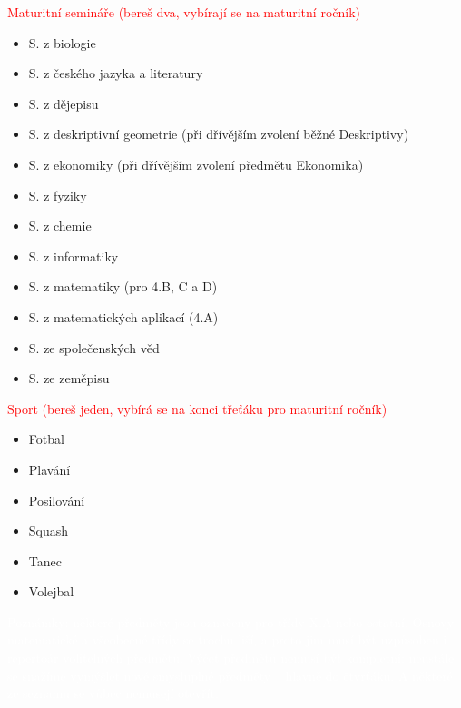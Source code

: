 \documentclass{article}
\begin{document}
\begin{multicols}{2}
  \vfill\null

  \columnbreak

  \noindent \textcolor{red}{Maturitní semináře (bereš dva, vybírají se na maturitní ročník)}
  \begin{itemize}
    \item S. z biologie
    \item S. z českého jazyka a literatury
    \item S. z dějepisu
    \item S. z deskriptivní geometrie (při
    dřívějším zvolení běžné Deskriptivy)
    \item S. z ekonomiky (při dřívějším zvolení předmětu Ekonomika)
    \item S. z fyziky
    \item S. z chemie
    \item S. z informatiky
    \item S. z matematiky (pro 4.B, C a D)
    \item S. z matematických aplikací (4.A)
    \item S. ze společenských věd
    \item S. ze zeměpisu
  \end{itemize}

  \noindent \textcolor{red}{Sport (bereš jeden, vybírá se na konci třeťáku pro maturitní ročník)}
  \begin{itemize}
    \item Fotbal
    \item Plavání
    \item Posilování
    \item Squash
    \item Tanec
    \item Volejbal
  \end{itemize}

  \begin{tcolorbox}[colback=red,boxrule=0pt]
    \textcolor{white}{\footnotesize Poznámky:
     některé předměty jsou označeny pro třídy X.A
      nebo ostatní. Osnovy matematické a všeobecné třídy se trochu liší, a proto jim musí být
      uzpůsoben i repertoár volitelných předmětů.
      Výčet předmětů nemusí být kompletní:
      neustále se snažíme vymýšlet nové smysluplné
      předměty -- hlavně do čtvrťáku. A některé ze
      seznamu se vůbec nemusejí otevřít.}
\end{tcolorbox}
\end{multicols}

\newpage
\end{document}
